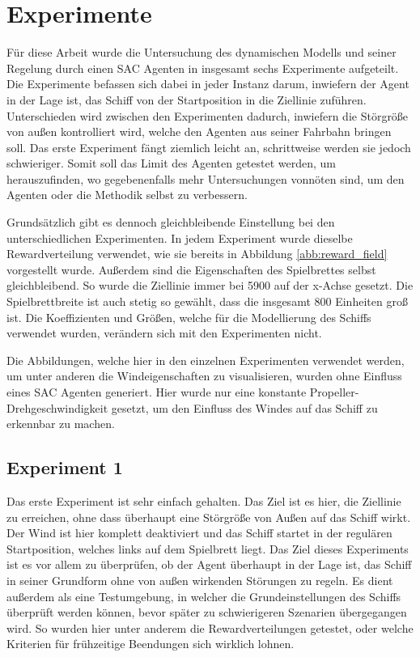 \documentclass[]{iat}
\begin{document}
\section{Experimente}
Für diese Arbeit wurde die Untersuchung des dynamischen Modells und seiner Regelung durch einen SAC Agenten in insgesamt sechs Experimente aufgeteilt. Die Experimente befassen sich dabei in jeder Instanz darum, inwiefern der Agent in der Lage ist, das Schiff von der Startposition in die Ziellinie zuführen. Unterschieden wird zwischen den Experimenten dadurch, inwiefern die Störgröße von außen kontrolliert wird, welche den Agenten aus seiner Fahrbahn bringen soll. Das erste Experiment fängt ziemlich leicht an, schrittweise werden sie jedoch schwieriger. Somit soll das Limit des Agenten getestet werden, um herauszufinden, wo gegebenenfalls mehr Untersuchungen vonnöten sind, um den Agenten oder die Methodik selbst zu verbessern.

Grundsätzlich gibt es dennoch gleichbleibende Einstellung bei den unterschiedlichen Experimenten. In jedem Experiment wurde dieselbe Rewardverteilung verwendet, wie sie bereits in Abbildung \ref{abb:reward_field} vorgestellt wurde. Außerdem sind die Eigenschaften des Spielbrettes selbst gleichbleibend. So wurde die Ziellinie immer bei 5900 auf der x-Achse gesetzt. Die Spielbrettbreite ist auch stetig so gewählt, dass die insgesamt 800 Einheiten groß ist. Die Koeffizienten und Größen, welche für die Modellierung des Schiffs verwendet wurden, verändern sich mit den Experimenten nicht.

Die Abbildungen, welche hier in den einzelnen Experimenten verwendet werden, um unter anderen die Windeigenschaften zu visualisieren, wurden ohne Einfluss eines SAC Agenten generiert. Hier wurde nur eine konstante Propeller-Drehgeschwindigkeit gesetzt, um den Einfluss des Windes auf das Schiff zu erkennbar zu machen.

\subsection*{Experiment 1}
Das erste Experiment ist sehr einfach gehalten. Das Ziel ist es hier, die Ziellinie zu erreichen, ohne dass überhaupt eine Störgröße von Außen auf das Schiff wirkt. Der Wind ist hier komplett deaktiviert und das Schiff startet in der regulären Startposition, welches links auf dem Spielbrett liegt. Das Ziel dieses Experiments ist es vor allem zu überprüfen, ob der Agent überhaupt in der Lage ist, das Schiff in seiner Grundform ohne von außen wirkenden Störungen zu regeln. Es dient außerdem als eine Testumgebung, in welcher die Grundeinstellungen des Schiffs überprüft werden können, bevor später zu schwierigeren Szenarien übergegangen wird. So wurden hier unter anderem die Rewardverteilungen getestet, oder welche Kriterien für frühzeitige Beendungen sich wirklich lohnen.
\end{document}
